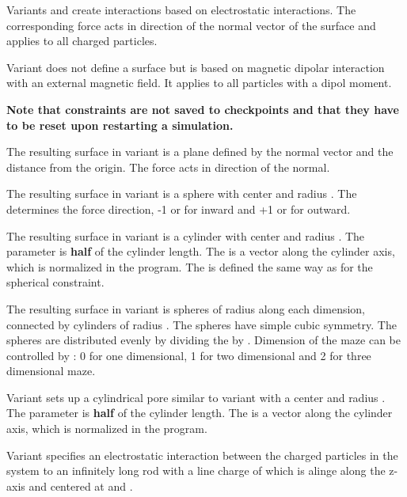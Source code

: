 Variants  and  create interactions based on electrostatic
interactions. The corresponding force acts in direction of the normal vector of the
surface and applies to all charged particles.

Variant  does not define a surface but is based on magnetic
dipolar interaction with an external magnetic field. It applies to all particles
with a dipol moment.

\textbf{Note that constraints are not saved to checkpoints and that they have to
be reset upon restarting a simulation.}

The resulting surface in variant  is a plane defined by the
normal vector    and the distance
 from the origin. The force acts in direction of the normal. 

The resulting surface in variant
 is a sphere with center    and radius
. The  determines the force direction, -1 or
 for inward and +1 or  for outward. 

The resulting surface
in variant  is a cylinder with center  
 and radius . The  parameter is \textbf{half} 
of the cylinder length. The  is a
vector along the cylinder axis, which is normalized in the program.
The  is defined the same way as for the spherical
constraint. 

The resulting surface in variant  is 
spheres of radius  along each dimension, connected by
cylinders of radius . The spheres have simple cubic
symmetry. The spheres are distributed evenly by dividing the
 by .  Dimension of the maze can be controlled by
: 0 for one dimensional, 1 for two dimensional and 2 for three
dimensional maze.

Variant  sets up a cylindrical pore similar to variant  
with a center
 and radius . The  parameter is \textbf{half} 
of the cylinder length. The  is a
vector along the cylinder axis, which is normalized in the program.

Variant  specifies an electrostatic interaction between the charged
particles in the system to an infinitely long rod with a
line charge of  which is alinge along the z-axis and centered at
 and .

